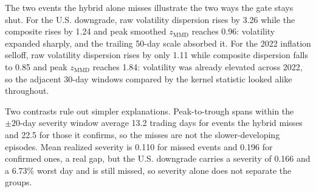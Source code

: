 \documentclass[pdflatex,sn-mathphys-num,iicol]{sn-jnl}
\begin{document}
\begin{appendices}
The two events the hybrid alone misses illustrate the two ways the gate stays shut. For the U.S. downgrade, raw volatility dispersion rises by 3.26 while the composite rises by 1.24 and peak smoothed $z_{\mathrm{MMD}}$ reaches 0.96: volatility expanded sharply, and the trailing 50-day scale absorbed it. For the 2022 inflation selloff, raw volatility dispersion rises by only 1.11 while composite dispersion falls to 0.85 and peak $z_{\mathrm{MMD}}$ reaches 1.84: volatility was already elevated across 2022, so the adjacent 30-day windows compared by the kernel statistic looked alike throughout.

Two contrasts rule out simpler explanations. Peak-to-trough spans within the $\pm20$-day severity window average 13.2 trading days for events the hybrid misses and 22.5 for those it confirms, so the misses are not the slower-developing episodes. Mean realized severity is 0.110 for missed events and 0.196 for confirmed ones, a real gap, but the U.S. downgrade carries a severity of 0.166 and a 6.73\% worst day and is still missed, so severity alone does not separate the groups.

\end{appendices}


\end{document}
